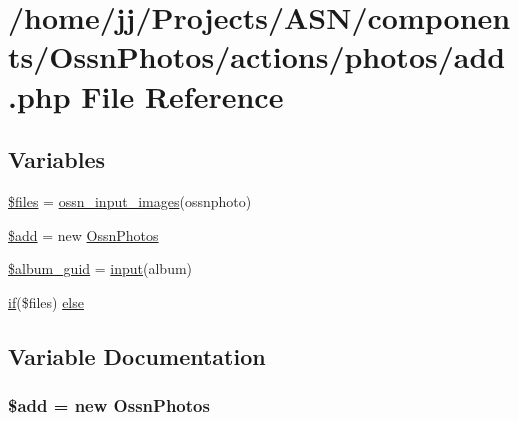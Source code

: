 \hypertarget{components_2_ossn_photos_2actions_2photos_2add_8php}{}\section{/home/jj/\+Projects/\+A\+S\+N/components/\+Ossn\+Photos/actions/photos/add.php File Reference}
\label{components_2_ossn_photos_2actions_2photos_2add_8php}
\subsection*{Variables}
\begin{DoxyCompactItemize}
\item 
\hyperlink{components_2_ossn_photos_2actions_2photos_2add_8php_a9590b15215a21e9b42eb546aeef79704}{\$files} = \hyperlink{ossn_8lib_8image_8php_a90854a979b254fd62fe3f5a27927d481}{ossn\+\_\+input\+\_\+images}(\textquotesingle{}ossnphoto\textquotesingle{})
\item 
\hyperlink{components_2_ossn_photos_2actions_2photos_2add_8php_a76aeb354fc71a358526ea9fbd7aae7a4}{\$add} = new \hyperlink{class_ossn_photos}{Ossn\+Photos}
\item 
\hyperlink{components_2_ossn_photos_2actions_2photos_2add_8php_a864e7d5465efc979134e4ca9a950483c}{\$album\+\_\+guid} = \hyperlink{ossn_8lib_8input_8php_a64ebee98b041c4f75f71ed3cd73cc8ed}{input}(\textquotesingle{}album\textquotesingle{})
\item 
\hyperlink{jquery_8tokeninput_8js_ad8dd46a3cbc004569e34401e9e71771a}{if}(\$files) \hyperlink{components_2_ossn_photos_2actions_2photos_2add_8php_adb03f81370fdb163748eafde54988853}{else}
\end{DoxyCompactItemize}


\subsection{Variable Documentation}
\subsubsection[{\texorpdfstring{\$add}{$add}}]{\setlength{\rightskip}{0pt plus 5cm}\${\bf add} = new {\bf Ossn\+Photos}}\hypertarget{components_2_ossn_photos_2actions_2photos_2add_8php_a76aeb354fc71a358526ea9fbd7aae7a4}{}\label{components_2_ossn_photos_2actions_2photos_2add_8php_a76aeb354fc71a358526ea9fbd7aae7a4}


